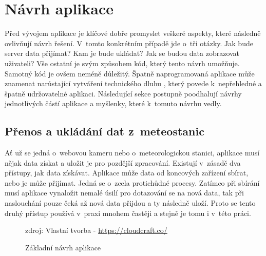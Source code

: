 \chapter{Návrh aplikace}
Před vývojem aplikace je klíčové dobře promyslet veškeré aspekty, které následně ovlivňují návrh řešení. V~tomto konkrétním případě jde o~tři otázky. Jak bude server data přijímat? Kam je bude ukládat? Jak se budou data zobrazovat uživateli? Vše ostatní je svým způsobem  kód, který tento návrh umožňuje. Samotný kód je ovšem neméně důležitý. Špatně naprogramovaná aplikace může znamenat narůstající vytváření technického dluhu \cite{techdebt}, který povede k~nepřehledné a špatně udržovatelné aplikaci. Následující sekce postupně poodhalují návrhy jednotlivých částí aplikace a myšlenky, které k~tomuto návrhu vedly.


\section{Přenos a ukládání dat z~meteostanic}
Ať už se jedná o~webovou kameru nebo o~meteorologickou stanici, aplikace musí nějak data získat a uložit je pro pozdější zpracování. Existují v~zásadě dva přístupy, jak data získávat. Aplikace může data od koncových zařízení sbírat, nebo je může přijímat. Jedná se o~zcela protichůdné procesy. Zatímco při sbírání musí aplikace vynaložit nemalé úsilí pro dotazování se na nová data, tak při naslouchání pouze čeká až nová data přijdou a ty následně uloží. Proto se tento druhý přístup používá v~praxi mnohem častěji a stejně je tomu i v~této práci.

\begin{figure}[h]
    \centering
	\caption{Základní návrh aplikace}
	\small zdroj: Vlastní tvorba - \url{https://cloudcraft.co/}
	\label{fig:zakladniNavrh}
\end{figure}

